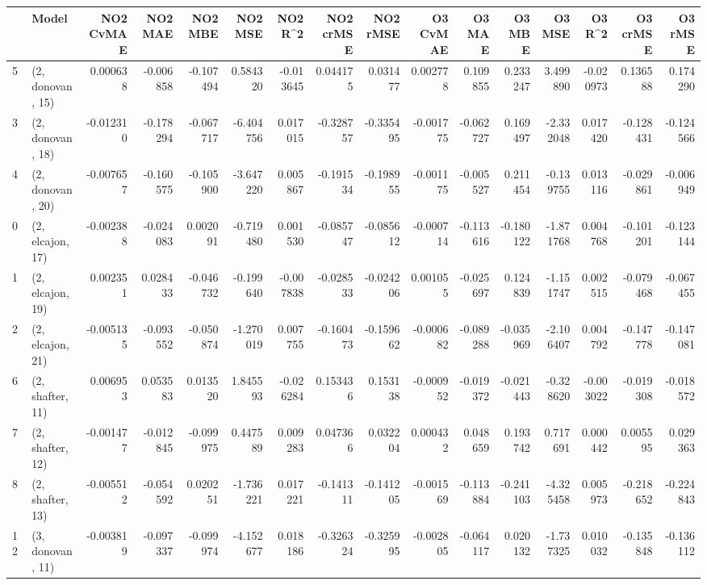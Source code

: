 \begin{tabular}{llrrrrrrrrrrrrrr}
\toprule
{} &             Model &  NO2 CvMAE &   NO2 MAE &   NO2 MBE &    NO2 MSE &   NO2 R\textasciicircum2 &  NO2 crMSE &  NO2 rMSE &  O3 CvMAE &    O3 MAE &    O3 MBE &     O3 MSE &    O3 R\textasciicircum2 &  O3 crMSE &   O3 rMSE \\
\midrule
5  &  (2, donovan, 15) &   0.000638 & -0.006858 & -0.107494 &   0.584320 & -0.013645 &   0.044175 &  0.031477 &  0.002778 &  0.109855 &  0.233247 &   3.499890 & -0.020973 &  0.136588 &  0.174290 \\
3  &  (2, donovan, 18) &  -0.012310 & -0.178294 & -0.067717 &  -6.404756 &  0.017015 &  -0.328757 & -0.335495 & -0.001775 & -0.062727 &  0.169497 &  -2.332048 &  0.017420 & -0.128431 & -0.124566 \\
4  &  (2, donovan, 20) &  -0.007657 & -0.160575 & -0.105900 &  -3.647220 &  0.005867 &  -0.191534 & -0.198955 & -0.001175 & -0.005527 &  0.211454 &  -0.139755 &  0.013116 & -0.029861 & -0.006949 \\
0  &  (2, elcajon, 17) &  -0.002388 & -0.024083 &  0.002091 &  -0.719480 &  0.001530 &  -0.085747 & -0.085612 & -0.000714 & -0.113616 & -0.180122 &  -1.871768 &  0.004768 & -0.101201 & -0.123144 \\
1  &  (2, elcajon, 19) &   0.002351 &  0.028433 & -0.046732 &  -0.199640 & -0.007838 &  -0.028533 & -0.024206 &  0.001055 & -0.025697 &  0.124839 &  -1.151747 &  0.002515 & -0.079468 & -0.067455 \\
2  &  (2, elcajon, 21) &  -0.005135 & -0.093552 & -0.050874 &  -1.270019 &  0.007755 &  -0.160473 & -0.159662 & -0.000682 & -0.089288 & -0.035969 &  -2.106407 &  0.004792 & -0.147778 & -0.147081 \\
6  &  (2, shafter, 11) &   0.006953 &  0.053583 &  0.013520 &   1.845593 & -0.026284 &   0.153436 &  0.153138 & -0.000952 & -0.019372 & -0.021443 &  -0.328620 & -0.003022 & -0.019308 & -0.018572 \\
7  &  (2, shafter, 12) &  -0.001477 & -0.012845 & -0.099975 &   0.447589 &  0.009283 &   0.047366 &  0.032204 &  0.000432 &  0.048659 &  0.193742 &   0.717691 &  0.000442 &  0.005595 &  0.029363 \\
8  &  (2, shafter, 13) &  -0.005512 & -0.054592 &  0.020251 &  -1.736221 &  0.017221 &  -0.141311 & -0.141205 & -0.001569 & -0.113884 & -0.241103 &  -4.325458 &  0.005973 & -0.218652 & -0.224843 \\
12 &  (3, donovan, 11) &  -0.003819 & -0.097337 & -0.099974 &  -4.152677 &  0.018186 &  -0.326324 & -0.325995 & -0.002805 & -0.064117 &  0.020132 &  -1.737325 &  0.010032 & -0.135848 & -0.136112 \\

\end{tabular}

